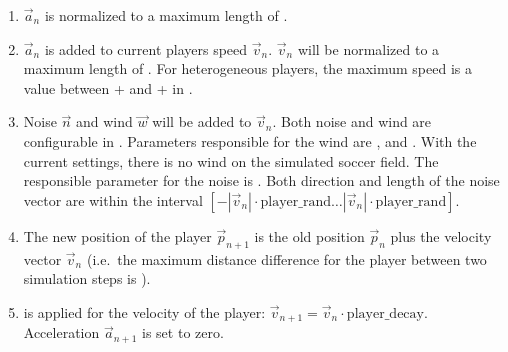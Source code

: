 \begin{enumerate}
\item $\vec{a}_n$ is normalized to a maximum length of
  .
\item $\vec{a}_n$ is added to current players speed
  $\vec{v}_n$. $\vec{v}_n$ will be normalized to a maximum length of
  . For heterogeneous players, the
  maximum speed is a value between  + 
   and
   +
   in .
\item Noise $\vec{n}$ and wind $\vec{w}$ will be added to
  $\vec{v}_{n}$. Both noise and wind are configurable in
  . Parameters responsible for the wind are
  ,  and
  . With the current settings, there is no wind on
  the simulated soccer field. The responsible parameter for the noise
  is . Both direction and length
  of the noise vector are within the interval $[ -|\vec{v}_{n}| \cdot
  \mathrm{player\_rand} \ldots |\vec{v}_{n}| \cdot \mathrm{player\_rand}]$.  
\item The new position of the player $\vec{p}_{n+1}$ is the old position
  $\vec{p}_{n}$ plus the velocity vector $\vec{v}_{n}$ (i.e.\ the maximum
  distance difference for the player between two simulation steps is 
  ).
\item {} is applied for the velocity of the player:
  $\vec{v}_{n+1} = \vec{v}_{n} \cdot
  \mathrm{player\_decay}$. Acceleration $\vec{a}_{n+1}$ is set to
  zero. 
\end{enumerate}

